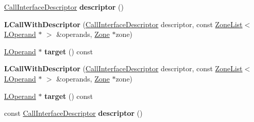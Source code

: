 \begin{DoxyCompactItemize}
\item 
\hyperlink{classv8_1_1internal_1_1_call_interface_descriptor}{Call\+Interface\+Descriptor} {\bfseries descriptor} ()\hypertarget{classv8_1_1internal_1_1_l_call_with_descriptor_a9b5d5a373907164d62702a643c41da8e}{}\label{classv8_1_1internal_1_1_l_call_with_descriptor_a9b5d5a373907164d62702a643c41da8e}

\item 
{\bfseries L\+Call\+With\+Descriptor} (\hyperlink{classv8_1_1internal_1_1_call_interface_descriptor}{Call\+Interface\+Descriptor} descriptor, const \hyperlink{classv8_1_1internal_1_1_zone_list}{Zone\+List}$<$ \hyperlink{classv8_1_1internal_1_1_l_operand}{L\+Operand} $\ast$ $>$ \&operands, \hyperlink{classv8_1_1internal_1_1_zone}{Zone} $\ast$zone)\hypertarget{classv8_1_1internal_1_1_l_call_with_descriptor_aef08b64c59fea5bdf7e3cc4e6ad17da5}{}\label{classv8_1_1internal_1_1_l_call_with_descriptor_aef08b64c59fea5bdf7e3cc4e6ad17da5}

\item 
\hyperlink{classv8_1_1internal_1_1_l_operand}{L\+Operand} $\ast$ {\bfseries target} () const \hypertarget{classv8_1_1internal_1_1_l_call_with_descriptor_a5f36cfb0ab3007ac639a4fa68b4b4162}{}\label{classv8_1_1internal_1_1_l_call_with_descriptor_a5f36cfb0ab3007ac639a4fa68b4b4162}

\item 
{\bfseries L\+Call\+With\+Descriptor} (\hyperlink{classv8_1_1internal_1_1_call_interface_descriptor}{Call\+Interface\+Descriptor} descriptor, const \hyperlink{classv8_1_1internal_1_1_zone_list}{Zone\+List}$<$ \hyperlink{classv8_1_1internal_1_1_l_operand}{L\+Operand} $\ast$ $>$ \&operands, \hyperlink{classv8_1_1internal_1_1_zone}{Zone} $\ast$zone)\hypertarget{classv8_1_1internal_1_1_l_call_with_descriptor_aef08b64c59fea5bdf7e3cc4e6ad17da5}{}\label{classv8_1_1internal_1_1_l_call_with_descriptor_aef08b64c59fea5bdf7e3cc4e6ad17da5}

\item 
\hyperlink{classv8_1_1internal_1_1_l_operand}{L\+Operand} $\ast$ {\bfseries target} () const \hypertarget{classv8_1_1internal_1_1_l_call_with_descriptor_a5f36cfb0ab3007ac639a4fa68b4b4162}{}\label{classv8_1_1internal_1_1_l_call_with_descriptor_a5f36cfb0ab3007ac639a4fa68b4b4162}

\item 
const \hyperlink{classv8_1_1internal_1_1_call_interface_descriptor}{Call\+Interface\+Descriptor} {\bfseries descriptor} ()\hypertarget{classv8_1_1internal_1_1_l_call_with_descriptor_ac81ca90af15fc24656387041c7893655}{}\label{classv8_1_1internal_1_1_l_call_with_descriptor_ac81ca90af15fc24656387041c7893655}


\end{DoxyCompactItemize}
